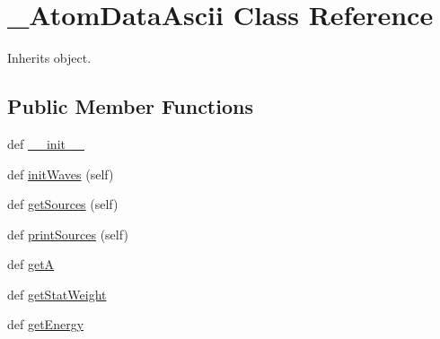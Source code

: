 \hypertarget{classpyneb_1_1core_1_1pynebcore_1_1___atom_data_ascii}{}\section{\+\_\+\+Atom\+Data\+Ascii Class Reference}
\label{classpyneb_1_1core_1_1pynebcore_1_1___atom_data_ascii}


Inherits object.

\subsection*{Public Member Functions}
\begin{DoxyCompactItemize}
\item 
def \hyperlink{classpyneb_1_1core_1_1pynebcore_1_1___atom_data_ascii_ac775ee34451fdfa742b318538164070e}{\+\_\+\+\_\+init\+\_\+\+\_\+}
\item 
def \hyperlink{classpyneb_1_1core_1_1pynebcore_1_1___atom_data_ascii_aecb5df9a52e3983689ccddc2c20cc6f0}{init\+Waves} (self)
\item 
def \hyperlink{classpyneb_1_1core_1_1pynebcore_1_1___atom_data_ascii_ada746cff051b4eefa5f61aa4ad0e7fa6}{get\+Sources} (self)
\item 
def \hyperlink{classpyneb_1_1core_1_1pynebcore_1_1___atom_data_ascii_a8391e786a420d63ed15d4efd3f04aad5}{print\+Sources} (self)
\item 
def \hyperlink{classpyneb_1_1core_1_1pynebcore_1_1___atom_data_ascii_a17192519660871ef6a77e6bdad6f580d}{get\+A}
\item 
def \hyperlink{classpyneb_1_1core_1_1pynebcore_1_1___atom_data_ascii_a00fb8d8bc6381e46ebb1b76b2770442a}{get\+Stat\+Weight}
\item 
def \hyperlink{classpyneb_1_1core_1_1pynebcore_1_1___atom_data_ascii_a8406acc27904d955ee4dbb458f60db52}{get\+Energy}
\end{DoxyCompactItemize}
